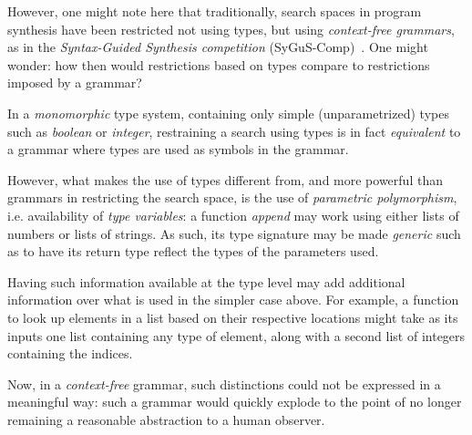 \documentclass{article}
\begin{document}

However, one might note here that traditionally,
search spaces in program synthesis have been restricted not using types,
but using \emph{context-free grammars},
as in the
\emph{Syntax-Guided Synthesis competition} (SyGuS-Comp)~\citep{sygus}.
One might wonder: how then would restrictions based on
types compare to restrictions imposed by a grammar?

In a \emph{monomorphic} type system,
containing only simple (unparametrized) types such as \emph{boolean} or \emph{integer},
restraining a search using types is in fact \emph{equivalent}
to a grammar where types are used as symbols in the grammar.%

However,
what makes the use of types different from,
and more powerful than grammars in restricting the search space,
is the use of \emph{parametric polymorphism}, i.e. availability of \emph{type variables}:
a function \emph{append} may work using either lists of numbers or lists of strings.%
As such, its type signature may be made \emph{generic} such as to have its return type reflect the types of the parameters used.

Having such information available at the type level may add additional information over what is used in the simpler case above.
For example, a function to look up elements in a list based on their respective locations might take as its inputs one list containing any type of element, along with a second list of integers containing the indices.

Now, in a \emph{context-free} grammar,
such distinctions could not be expressed in a meaningful way:
such a grammar would quickly explode to the point of no longer remaining a reasonable abstraction to a human observer.
\end{document}
